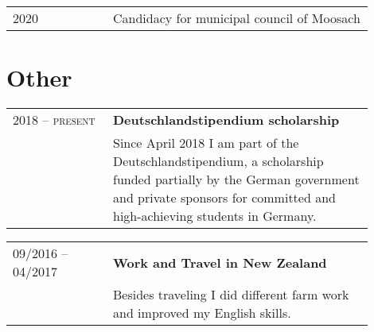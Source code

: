 \documentclass[a4paper, ]{article}
\newenvironment{cventry}[2]
{   
    \setlength{\tabcolsep}{1.25em}
    \hypersetup{urlcolor=black}
    \begin{center}\hspace{-1.25cm}\begin{tabular}{p{0.25\linewidth}|p{0.65\linewidth}}
    \raggedleft\scshape #1 & \bfseries#2 \vspace{0.1cm}\\ & 
}
{\end{tabular}\end{center}}
\newenvironment{cventrynoheading}[1]
{
    \setlength{\tabcolsep}{1.25em}
    \begin{center}\hspace{-1.25cm}\begin{tabular}{p{0.25\linewidth}|p{0.65\linewidth}}
    \raggedleft\scshape #1 & 
}
{\end{tabular}\end{center}}
\begin{document}
\begin{cventrynoheading}{2020}
    Candidacy for municipal council of Moosach
\end{cventrynoheading}


\section{Other}

\begin{cventry}{2018 -- present} {Deutschlandstipendium scholarship}
    Since April 2018 I am part of the Deutschlandstipendium, a scholarship 
    funded partially by the German government and private sponsors for 
    committed and high-achieving students in Germany.
\end{cventry}

\begin{cventry}{09/2016 -- 04/2017}{Work and Travel in New Zealand}
    Besides traveling I did different farm work and improved my English skills.
\end{cventry}
\end{document}
